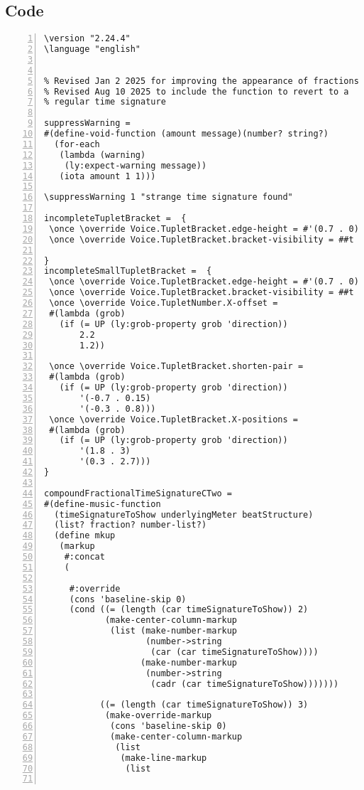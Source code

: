 \subsection{Code}
\begin{Verbatim}[numbers=left,xleftmargin=5mm]
\version "2.24.4"
\language "english"


% Revised Jan 2 2025 for improving the appearance of fractions
% Revised Aug 10 2025 to include the function to revert to a
% regular time signature

suppressWarning =
#(define-void-function (amount message)(number? string?)
  (for-each
   (lambda (warning)
    (ly:expect-warning message))
   (iota amount 1 1)))

\suppressWarning 1 "strange time signature found"

incompleteTupletBracket =  {
 \once \override Voice.TupletBracket.edge-height = #'(0.7 . 0)
 \once \override Voice.TupletBracket.bracket-visibility = ##t

}
incompleteSmallTupletBracket =  {
 \once \override Voice.TupletBracket.edge-height = #'(0.7 . 0)
 \once \override Voice.TupletBracket.bracket-visibility = ##t
 \once \override Voice.TupletNumber.X-offset =
 #(lambda (grob)
   (if (= UP (ly:grob-property grob 'direction))
       2.2
       1.2))

 \once \override Voice.TupletBracket.shorten-pair =
 #(lambda (grob)
   (if (= UP (ly:grob-property grob 'direction))
       '(-0.7 . 0.15)
       '(-0.3 . 0.8)))
 \once \override Voice.TupletBracket.X-positions =
 #(lambda (grob)
   (if (= UP (ly:grob-property grob 'direction))
       '(1.8 . 3)
       '(0.3 . 2.7)))
}

compoundFractionalTimeSignatureCTwo =
#(define-music-function
  (timeSignatureToShow underlyingMeter beatStructure)
  (list? fraction? number-list?)
  (define mkup
   (markup
    #:concat
    (

     #:override
     (cons 'baseline-skip 0)
     (cond ((= (length (car timeSignatureToShow)) 2)
            (make-center-column-markup
             (list (make-number-markup
                    (number->string
                     (car (car timeSignatureToShow))))
                   (make-number-markup
                    (number->string
                     (cadr (car timeSignatureToShow)))))))

           ((= (length (car timeSignatureToShow)) 3)
            (make-override-markup
             (cons 'baseline-skip 0)
             (make-center-column-markup
              (list
               (make-line-markup
                (list


\end{Verbatim}
